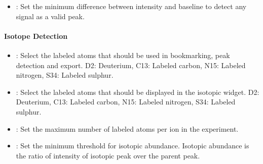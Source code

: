 \documentclass[letterpaper,10pt,english,openany,oneside]{sphinxmanual}
\begin{document}

\begin{itemize}
\item {} 
: Set the minimum difference between intensity and baseline to detect any signal as a valid peak.

\end{itemize}


\paragraph{Isotope Detection}
\label{\detokenize{IntroductiontoElMAVENUI:isotope-detection}}

\begin{itemize}
\item {} 
: Select the labeled atoms that should be used in bookmarking, peak detection and export. D2: Deuterium, C13: Labeled carbon, N15: Labeled nitrogen, S34: Labeled sulphur.

\item {} 
: Select the labeled atoms that should be displayed in the isotopic widget. D2: Deuterium, C13: Labeled carbon, N15: Labeled nitrogen, S34: Labeled sulphur.

\item {} 
: Set the maximum number of labeled atoms per ion in the experiment.

\item {} 
: Set the minimum threshold for isotopic abundance. Isotopic abundance is the ratio of intensity of isotopic peak over the parent peak.

\end{itemize}
\end{document}
